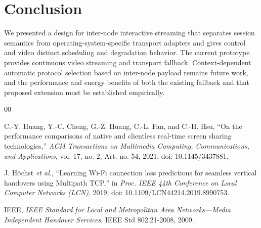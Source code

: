 \documentclass[conference]{IEEEtran}
\begin{document}
\section{Conclusion}
We presented a design for inter-node interactive streaming that separates
session semantics from operating-system-specific transport adapters and
gives control and video distinct scheduling and degradation behavior.
The current prototype provides continuous video streaming and transport
fallback. Context-dependent automatic protocol selection based on inter-node
payload remains future work, and the performance and energy benefits of both
the existing fallback and that proposed extension must be established
empirically.

\begin{thebibliography}{00}

C.-Y. Huang, Y.-C. Cheng, G.-Z. Huang, C.-L. Fan, and C.-H. Hsu,
``On the performance comparisons of native and clientless real-time screen
sharing technologies,'' \emph{ACM Transactions on Multimedia Computing,
Communications, and Applications}, vol. 17, no. 2, Art. no. 54, 2021,
doi: 10.1145/3437881.

J. H{\"o}chst \emph{et al.}, ``Learning Wi-Fi connection loss predictions
for seamless vertical handovers using Multipath TCP,'' in
\emph{Proc. IEEE 44th Conference on Local Computer Networks (LCN)}, 2019,
doi: 10.1109/LCN44214.2019.8990753.

IEEE, \emph{IEEE Standard for Local and Metropolitan Area Networks---Media
Independent Handover Services}, IEEE Std 802.21-2008, 2009.

\end{thebibliography}
\end{document}
